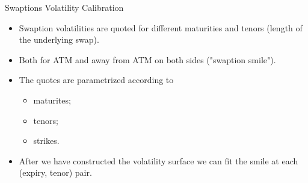 \documentclass{beamer}
\begin{document}
\begin{frame}{Swaptions Volatility Calibration}
	\begin{itemize}
		\item Swaption volatilities are quoted for different maturities and tenors (length of the underlying swap).
		\item Both for ATM and away from ATM on both sides ("swaption smile").
		\item The quotes are parametrized according to
		\begin{itemize}
			\item maturites;
			\item tenors;
			\item strikes.
		\end{itemize}
		\item After we have constructed the volatility surface we can fit the smile at each (expiry, tenor) pair.
	\end{itemize}
\end{frame}

%
\end{document}
